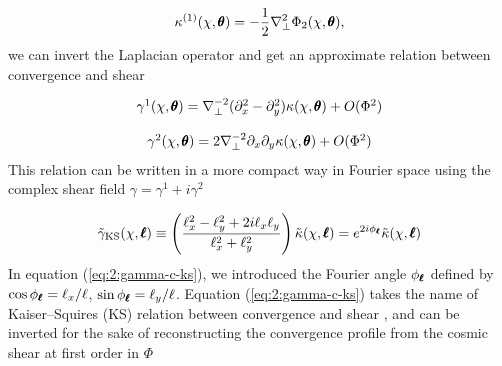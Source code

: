 \begin{equation}
\label{eq:2:kappa-1-lapl}
\kappa^{(1)}(\chi,\pmb{\theta}) = -\frac{1}{2}\nabla_\perp^2 \Phi_2(\chi,\pmb{\theta}),
\end{equation}
%
we can invert the Laplacian operator and get an approximate relation between convergence and shear

\begin{equation}
\label{eq:2:gamma-1-lapl}
\begin{matrix}
\gamma^1(\chi,\pmb{\theta}) = \nabla_\perp^{-2} (\partial_x^2-\partial_y^2) \kappa(\chi,\pmb{\theta}) + O(\Phi^2) \\ \\
\gamma^2(\chi,\pmb{\theta}) = 2\nabla_\perp^{-2} \partial_x\partial_y \kappa(\chi,\pmb{\theta}) + O(\Phi^2)
\end{matrix}
\end{equation}
%
This relation can be written in a more compact way in Fourier space using the complex shear field $\gamma=\gamma^1+i\gamma^2$  

\begin{equation}
\label{eq:2:gamma-c-ks}
\tilde{\gamma}_{\rm KS}(\chi,\pmb{\ell}) \equiv \left(\frac{\ell_x^2-\ell_y^2+2i\ell_x\ell_y}{\ell_x^2+\ell_y^2}\right) \tilde{\kappa}(\chi,\pmb{\ell}) = e^{2i\phi_{\pmb{\ell}}} \tilde{\kappa}(\chi,\pmb{\ell})
\end{equation}
%
In equation (\ref{eq:2:gamma-c-ks}), we introduced the Fourier angle $\phi_{\pmb{\ell}}$ defined by $\cos \phi_{\pmb{\ell}} = \ell_x/\ell$, $\sin\phi_{\pmb{\ell}}=\ell_y/\ell$. Equation (\ref{eq:2:gamma-c-ks}) takes the name of Kaiser--Squires (KS) relation between convergence and shear \citep{KaiserSquires}, and can be inverted for the sake of reconstructing the convergence profile from the cosmic shear at first order in $\Phi$

